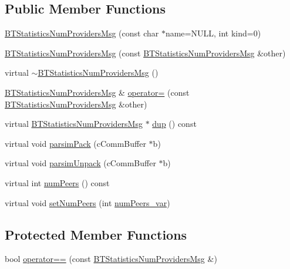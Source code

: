 \subsection*{Public Member Functions}
\begin{DoxyCompactItemize}
\item 
\hyperlink{classBTStatisticsNumProvidersMsg_a27c5fa76813c23277ade3648bee98f8a}{B\+T\+Statistics\+Num\+Providers\+Msg} (const char $\ast$name=N\+U\+L\+L, int kind=0)
\item 
\hyperlink{classBTStatisticsNumProvidersMsg_a37295adc4eddd651cfb4569f14c8df7f}{B\+T\+Statistics\+Num\+Providers\+Msg} (const \hyperlink{classBTStatisticsNumProvidersMsg}{B\+T\+Statistics\+Num\+Providers\+Msg} \&other)
\item 
virtual \hyperlink{classBTStatisticsNumProvidersMsg_a4fc1f39f4de311052f544e5273b85d3d}{$\sim$\+B\+T\+Statistics\+Num\+Providers\+Msg} ()
\item 
\hyperlink{classBTStatisticsNumProvidersMsg}{B\+T\+Statistics\+Num\+Providers\+Msg} \& \hyperlink{classBTStatisticsNumProvidersMsg_a217879768d37edfd58e4fa4b06a6de72}{operator=} (const \hyperlink{classBTStatisticsNumProvidersMsg}{B\+T\+Statistics\+Num\+Providers\+Msg} \&other)
\item 
virtual \hyperlink{classBTStatisticsNumProvidersMsg}{B\+T\+Statistics\+Num\+Providers\+Msg} $\ast$ \hyperlink{classBTStatisticsNumProvidersMsg_a8292a8314754ac51e96c36918600ebc4}{dup} () const 
\item 
virtual void \hyperlink{classBTStatisticsNumProvidersMsg_affef2efd7707ebeae624a2713cdcd2ff}{parsim\+Pack} (c\+Comm\+Buffer $\ast$b)
\item 
virtual void \hyperlink{classBTStatisticsNumProvidersMsg_a4864f751c4dc1a4186797eb9170cbc80}{parsim\+Unpack} (c\+Comm\+Buffer $\ast$b)
\item 
virtual int \hyperlink{classBTStatisticsNumProvidersMsg_a6a9306c19e6e47b66d630349696d0a42}{num\+Peers} () const 
\item 
virtual void \hyperlink{classBTStatisticsNumProvidersMsg_a56eb0c930bad9c15687db81ed15e9d47}{set\+Num\+Peers} (int \hyperlink{classBTStatisticsNumProvidersMsg_a245be09caa91893aebd3db42d5bc0e9d}{num\+Peers\+\_\+var})
\end{DoxyCompactItemize}
\subsection*{Protected Member Functions}
\begin{DoxyCompactItemize}
\item 
bool \hyperlink{classBTStatisticsNumProvidersMsg_acdef6ab3073f8bc86c11f72864b52eb6}{operator==} (const \hyperlink{classBTStatisticsNumProvidersMsg}{B\+T\+Statistics\+Num\+Providers\+Msg} \&)
\end{DoxyCompactItemize}
